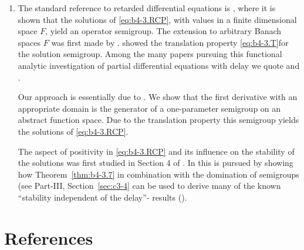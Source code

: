 \begin{enumerate}[label=\emph{Section \arabic*:}, wide, itemsep=1ex]
\item The standard reference to retarded differential equations is \textcite{hale:1977}, where it is shown that the solutions of \eqref{eq:b4-3.RCP}, with values in a finite dimensional space $F$, yield an operator semigroup. 
The extension to arbitrary Banach spaces $F$ was first made by \textcite{traviswebb:1974}. 
\textcite{plant:1977} showed the translation property \eqref{eq:b4-3.T}for the solution semigroup. 
Among the many papers pursuing this functional analytic investigation of partial differential equations with delay we quote \textcite{diblasioetal:1984} and \textcite{kunischschappacher:1983}.

Our approach is essentially due to \textcite{kerscher:1986}. 
We show that the first derivative with an appropriate domain is the generator of a one-parameter semigroup on an abstract function space. 
Due to the translation property this semigroup yields the solutions of \eqref{eq:b4-3.RCP}.

The aspect of positivity in \eqref{eq:b4-3.RCP} and its influence on the stability of the solutions was first studied in Section 4 of \textcite{kerschernagel:1984}. 
In \textcite{kerscher:1986} this is pursued by showing how Theorem~\ref{thm:b4-3.7} in combination with the domination of semigroups (see Part-III, Section~\ref{sec:c3-4} can be used to derive many of the known \enquote{stability independent of the delay}- results (\eg  \textcite{cookeferreira:1983}).
\end{enumerate}
\section*{References}
{\RaggedRight
  \printbibliography[heading=none]
 }

